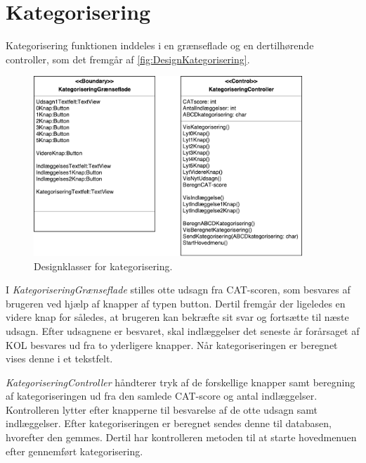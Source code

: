 \section{Kategorisering}
Kategorisering funktionen inddeles i en grænseflade og en dertilhørende controller, som det fremgår af \autoref{fig:DesignKategorisering}.

\begin{figure} [H]
\centering
\includegraphics[width=0.9\textwidth]{figures/MVC/MVCKategorisering}
\caption{Designklasser for kategorisering.}
\label{fig:DesignKategorisering}
\end{figure}

I \textit{KategoriseringGrænseflade} stilles otte udsagn fra CAT-scoren, som besvares af brugeren ved hjælp af knapper af typen button. Dertil fremgår der ligeledes en videre knap for således, at brugeren kan bekræfte sit svar og fortsætte til næste udsagn. Efter udsagnene er besvaret, skal indlæggelser det seneste år forårsaget af KOL besvares ud fra to yderligere knapper. Når kategoriseringen er beregnet vises denne i et tekstfelt. 

\textit{KategoriseringController} håndterer tryk af de forskellige knapper samt beregning af kategoriseringen ud fra den samlede CAT-score og antal indlæggelser. Kontrolleren lytter efter knapperne til besvarelse af de otte udsagn samt indlæggelser. Efter kategoriseringen er beregnet sendes denne til databasen, hvorefter den gemmes. Dertil har kontrolleren metoden til at starte hovedmenuen efter gennemført kategorisering.  